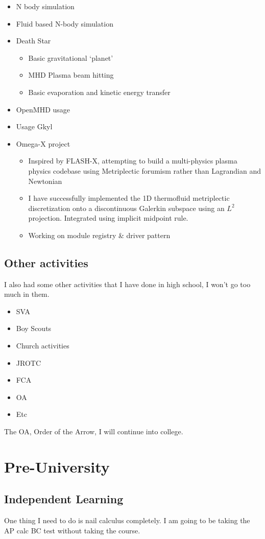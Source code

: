 \begin{itemize}
    \item N body simulation 
    \item Fluid based N-body simulation
    \item Death Star
    \begin{itemize}
        \item Basic gravitational ‘planet’
        \item MHD Plasma beam hitting
        \item Basic evaporation and kinetic energy transfer
    \end{itemize}
    \item OpenMHD usage
    \item Usage Gkyl
    \item Omega-X project
    \begin{itemize}
        \item Inspired by FLASH-X, attempting to build a multi-physics plasma physics codebase using Metriplectic forumism rather than Lagrandian and Newtonian
        \item I have successfully implemented the 1D thermofluid metriplectic discretization onto a discontinuous Galerkin subspace using an $L^2$ projection. Integrated using implicit midpoint rule.
        \item Working on module registry \& driver pattern
    \end{itemize}
\end{itemize}
\subsection{Other activities}
I also had some other activities that I have done in high school, I won't go too much in them. 
\begin{itemize}
    \item SVA
    \item Boy Scouts
    \item Church activities
    \item JROTC
    \item FCA
    \item OA
    \item Etc
\end{itemize}
The OA, Order of the Arrow, I will continue into college.
\section{Pre-University}
\subsection{Independent Learning}
One thing I need to do is nail calculus completely. I am going to be taking the AP calc BC test without taking the course. 

